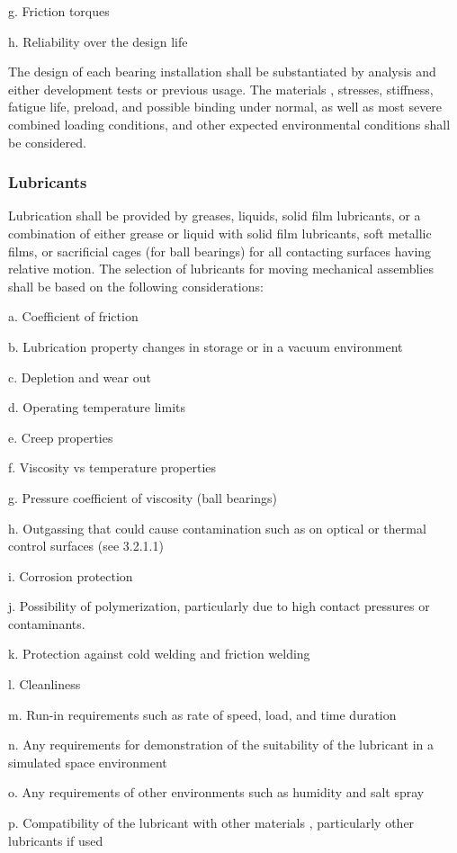 \documentclass[12pt]{article}
\begin{document}
g. Friction torques

h. Reliability over the design life

The design of each bearing installation shall be substantiated by analysis and either development tests or previous usage. 
The materials , stresses, stiffness, fatigue life, preload, and possible binding under normal, as well as most severe combined loading conditions, and other expected environmental conditions shall be considered.

\subsubsection{Lubricants} %
Lubrication shall be provided by greases, liquids, solid film lubricants, or a combination of either grease or liquid with solid film lubricants, soft metallic films, or sacrificial cages (for ball bearings) for all contacting surfaces having relative motion. 
The selection of lubricants for moving mechanical assemblies shall be based on the following considerations:

a. Coefficient of friction

b. Lubrication property changes in storage or in a vacuum environment

c. Depletion and wear out

d. Operating temperature limits

e. Creep properties

f. Viscosity vs temperature properties

g. Pressure coefficient of viscosity (ball bearings)

h. Outgassing that could cause contamination such as on optical or thermal control surfaces (see 3.2.1.1)

i. Corrosion protection

j. Possibility of polymerization, particularly due to high contact pressures or contaminants.

k. Protection against cold welding and friction welding

l. Cleanliness

m. Run-in requirements such as rate of speed, load, and time duration

n. Any requirements for demonstration of the suitability of the lubricant in a simulated space environment

o. Any requirements of other environments such as humidity and salt spray

p. Compatibility of the lubricant with other materials , particularly other lubricants if used
\end{document}
